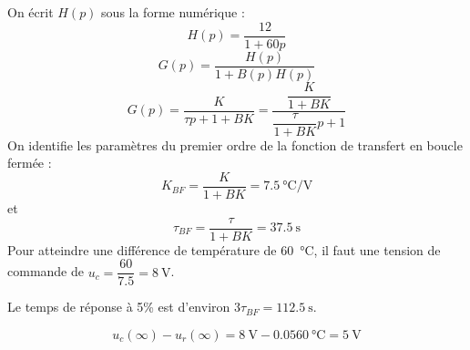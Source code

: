 On écrit $H(p)$ sous la forme numérique :
\[
    H(p)=\dfrac{12}{1+60p}
\]
\[
    G(p)=\dfrac{H(p)}{1+B(p)H(p)}
\]
\[
    G(p)=\dfrac{K}{\tau p+1+BK}=\dfrac{\dfrac{K}{1+BK}}{\dfrac{\tau}{1+BK}p+1}
\]
On identifie les paramètres du premier ordre de la fonction de transfert en 
boucle fermée :
\[
    K_{BF}=\dfrac{K}{1+BK}=\SI{7.5}{\celsius\per\volt}
\]
et
\[
    \tau_{BF}=\dfrac{\tau}{1+BK}=\SI{37.5}{\second}
\]
Pour atteindre une différence de température de \SI{60}{\celsius}, il faut une 
tension de commande de $u_c=\dfrac{60}{7.5}=\SI{8}{\volt}$.

Le temps de réponse à 5\% est d'environ $3\tau_{BF}=\SI{112.5}{\second}$.

\[
    u_c(\infty)-u_r(\infty)=\SI{8}{\volt}-0.05\SI{60}{\celsius}=\SI{5}{\volt}
\]


